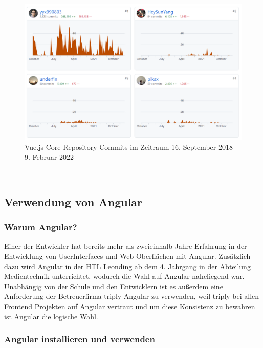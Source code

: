 \begin{figure}
    \centering
    \includegraphics[scale=0.8]{pics/vue_contributions}
    \caption{Vue.js Core Repository Commits im Zeitraum 16. September 2018 - 9. Februar 2022~\cite{VueJSContribution}}
    \label{fig:vue_contributions}
\end{figure}

~\cite{best-frontend-frameworks, best-frontend-framework-2022, angular-vs-react-vs-vue}

\subsection{Verwendung von Angular}

\subsubsection{Warum Angular?}
Einer der Entwickler hat bereits mehr als zweieinhalb Jahre Erfahrung in der Entwicklung von UserInterfaces und Web-Oberflächen mit Angular.
Zusätzlich dazu wird Angular in der HTL Leonding ab dem 4. Jahrgang in der Abteilung Medientechnik unterrichtet, wodurch
die Wahl auf Angular naheliegend war.
Unabhängig von der Schule und den Entwicklern ist es außerdem eine Anforderung der Betreuerfirma triply Angular zu verwenden,
weil triply bei allen Frontend Projekten auf Angular vertraut und um diese Konsistenz zu bewahren ist Angular die logische Wahl.

\subsubsection{Angular installieren und verwenden}


